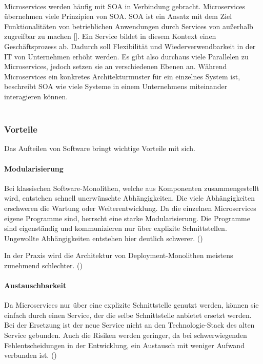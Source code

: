 \\
Microservices werden häufig mit \ac{SOA} in Verbindung gebracht. Microservices übernehmen viele Prinzipien von \ac{SOA}. \ac{SOA} ist ein Ansatz mit dem Ziel Funktionalitäten von betrieblichen Anwendungen durch Services von außerhalb zugreifbar zu machen [\cite[S. 2]{wolffMicroservices2018}]. Ein Service bildet in diesem Kontext einen Geschäftsprozess ab. Dadurch soll Flexibilität und Wiederverwendbarkeit in der IT von Unternehmen erhöht werden. Es gibt also durchaus viele Parallelen zu Microservices, jedoch setzen sie an verschiedenen Ebenen an. Während Microservices ein konkretes Architekturmuster für ein einzelnes System ist, beschreibt \ac{SOA} wie viele Systeme in einem Unternehmens miteinander interagieren können. \\
\\

\subsubsection{Vorteile}

Das Aufteilen von Software bringt wichtige Vorteile mit sich.

\paragraph{Modularisierung}
Bei klassischen Software-Monolithen, welche aus Komponenten zusammengestellt wird, entstehen schnell unerwünschte Abhängigkeiten. Die viele Abhängigkeiten erschweren die Wartung oder Weiterentwicklung. Da die einzelnen Microservices eigene Programme sind, herrscht eine starke Modularisierung. Die Programme sind eigenständig und kommunizieren nur über explizite Schnittstellen. Ungewollte Abhängigkeiten entstehen hier deutlich schwerer. (\cite[S. 3]{wolffMicroservices2018})

In der Praxis wird die Architektur von Deployment-Monolithen meistens zunehmend schlechter. (\cite[S. 3]{wolffMicroservices2018})

\paragraph{Austauschbarkeit}
Da Microservices nur über eine explizite Schnittstelle genutzt werden, können sie einfach durch einen Service, der die selbe Schnittstelle anbietet ersetzt werden. Bei der Ersetzung ist der neue Service nicht an den Technologie-Stack des alten Service gebunden. Auch die Risiken werden geringer, da bei schwerwiegenden Fehlentscheidungen in der Entwicklung, ein Austausch mit weniger Aufwand verbunden ist. (\cite[S. 4]{wolffMicroservices2018})

